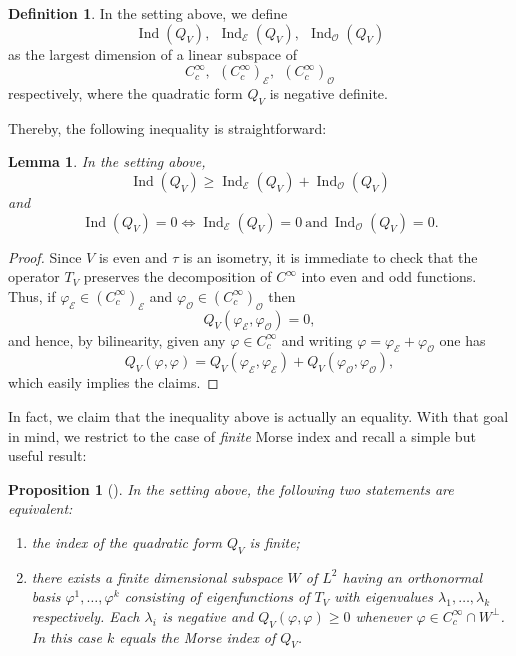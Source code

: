 \documentclass[JEP,XML,SOM,Unicode]{cedram}
\let\mathcal\mathscr
\newcounter{cas}
\DeclareMathOperator{\Ind}{Ind}
\newtheorem{lem}[thm]{Lemma}
\newtheorem{prop}[thm]{Proposition}
\theoremstyle{definition}
\newtheorem{definition}[thm]{Definition}
\begin{document}
\begin{definition}\label{def:index} In the setting above, we define
\[
\Ind(Q_V), \ \ \Ind_{\mathcal{E}} (Q_V), \ \ \Ind_{\mathcal{O}} (Q_V)
\]
as the largest dimension of a linear subspace of
\[
C^{\infty}_c, \ \ (C^{\infty}_c)_{\mathcal{E}}, \ \ (C^{\infty}_c)_{\mathcal{O}}
\]
respectively, where the quadratic form $Q_V$ is negative definite.
\end{definition}

Thereby, the following inequality is straightforward:

\begin{lem}\label{lem:ineq}
In the setting above,
\[
\Ind(Q_V) \geq \Ind_{\mathcal{E}} (Q_V)+\Ind_{\mathcal{O}} (Q_V)
\]
and
\[
\Ind(Q_V)=0 \iff \Ind_{\mathcal{E}} (Q_V)=0 \ \text{and} \ \Ind_{\mathcal{O}} (Q_V)=0.
\]
\end{lem}

\begin{proof} Since $V$ is even and $\tau$ is an isometry, it is immediate to check that the operator $T_V$ preserves the decomposition of $C^{\infty}$ into even and odd functions. Thus, if $\varphi_{\mathcal{E}}\in (C^{\infty}_c)_{\mathcal{E}}$ and $\varphi_{\mathcal{O}}\in (C^{\infty}_c)_{\mathcal{O}}$ then
\begin{equation}\label{eq:mixedprod}
Q_{V}(\varphi_{\mathcal{E}},\varphi_{\mathcal{O}})=0,
\end{equation}
and hence, by bilinearity, given any $\varphi\in C^{\infty}_c$ and writing $\varphi=\varphi_{\mathcal{E}}+\varphi_{\mathcal{O}}$ one has
\[
Q_{V}(\varphi,\varphi)=Q_{V}(\varphi_{\mathcal{E}},\varphi_{\mathcal{E}})+Q_{V}(\varphi_{\mathcal{O}},\varphi_{\mathcal{O}}),
\]
which easily implies the claims.
\end{proof}

In fact, we claim that the inequality above is actually an equality.
With that goal in mind, we restrict to the case of \emph{finite} Morse index and recall a simple but useful result:

\begin{prop}[{\cf \cite[Prop.\,2]{FC85}}]\label{pro:l2spec}
In the setting above, the following two statements are equivalent:
\begin{enumerate}
\item{the index of the quadratic form $Q_V$ is finite;}
\item{there exists a finite dimensional subspace $W$ of $L^2$ having an orthonormal basis $\varphi^1,\ldots,\varphi^k$ consisting of eigenfunctions of $T_V$ with eigenvalues $\lambda_1,\ldots,\lambda_k$ respectively. Each $\lambda_i$ is negative and $Q_V(\varphi,\varphi)\geq 0$ whenever $\varphi\in C^{\infty}_c\cap W^{\perp}$. In this case $k$ equals the Morse index of $Q_V$.}
\end{enumerate}
\end{prop}
\end{document}

